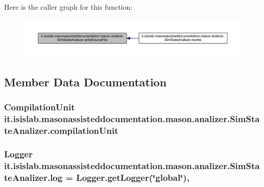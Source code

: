 Here is the caller graph for this function\-:
\nopagebreak
\begin{figure}[H]
\begin{center}
\leavevmode
\includegraphics[width=350pt]{classit_1_1isislab_1_1masonassisteddocumentation_1_1mason_1_1analizer_1_1_sim_state_analizer_a310f2f2452a5f26ea5e1f86bcbc88f56_icgraph}
\end{center}
\end{figure}




\subsection{Member Data Documentation}
\hypertarget{classit_1_1isislab_1_1masonassisteddocumentation_1_1mason_1_1analizer_1_1_sim_state_analizer_a56f6f2a78ed4ed2aca4b727f945a32ed}{
\subsubsection[{compilation\-Unit}]{\setlength{\rightskip}{0pt plus 5cm}Compilation\-Unit it.\-isislab.\-masonassisteddocumentation.\-mason.\-analizer.\-Sim\-State\-Analizer.\-compilation\-Unit\hspace{0.3cm}{\ttfamily [private]}}}\label{classit_1_1isislab_1_1masonassisteddocumentation_1_1mason_1_1analizer_1_1_sim_state_analizer_a56f6f2a78ed4ed2aca4b727f945a32ed}
\hypertarget{classit_1_1isislab_1_1masonassisteddocumentation_1_1mason_1_1analizer_1_1_sim_state_analizer_acec7226fdf376622213474dea1ee66f4}{
\subsubsection[{log}]{\setlength{\rightskip}{0pt plus 5cm}Logger it.\-isislab.\-masonassisteddocumentation.\-mason.\-analizer.\-Sim\-State\-Analizer.\-log = Logger.\-get\-Logger(\char`\"{}global\char`\"{})\hspace{0.3cm}{\ttfamily [static]}, {\ttfamily [private]}}}\label{classit_1_1isislab_1_1masonassisteddocumentation_1_1mason_1_1analizer_1_1_sim_state_analizer_acec7226fdf376622213474dea1ee66f4}
